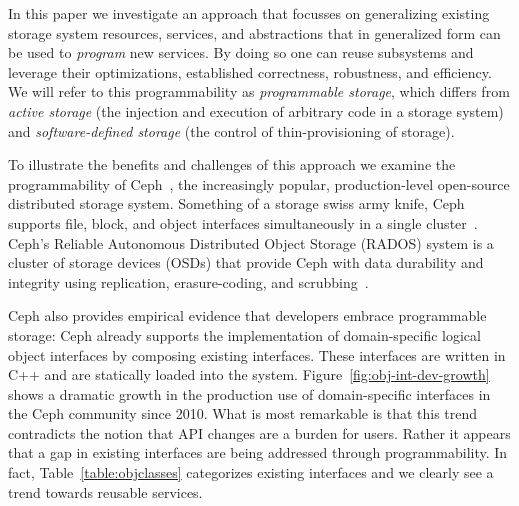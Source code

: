 \documentclass[10pt,twocolumn]{article}
\begin{document}
In this paper we investigate an approach that focusses on generalizing
existing storage system resources, services, and abstractions that in
generalized form can be used to \emph{program} new services. By doing so
one can reuse subsystems and leverage their optimizations,
established correctness, robustness, and efficiency. We will refer to
this programmability as \emph{programmable storage}, which differs from
\emph{active storage} (the injection and execution of arbitrary code in
a storage system) and \emph{software-defined storage} (the control of
thin-provisioning of storage).

To illustrate the benefits and challenges of this approach we examine
the programmability of Ceph~\cite{weil:osdi2006-ceph,ceph}, the increasingly
popular, production-level open-source distributed storage system.
Something of a storage swiss army knife, Ceph supports file, block, and
object interfaces simultaneously in a single cluster~\cite{ceph_contributors_ceph_2010}. Ceph's Reliable Autonomous 
Distributed Object Storage (RADOS) system is a cluster of storage
devices (OSDs) that provide Ceph with data durability and integrity
using replication, erasure-coding, and scrubbing~\cite{weil_rados_2007}. 

Ceph also provides empirical evidence that developers embrace programmable storage: Ceph already supports the
implementation of domain-specific logical object interfaces by composing
existing interfaces. These interfaces are written in C++ and are statically
loaded into the system. Figure~\ref{fig:obj-int-dev-growth} shows a dramatic growth in the production use of
domain-specific interfaces in the Ceph community since 2010.  What is most
remarkable is that this trend contradicts the notion that API changes are a
burden for users.
Rather it appears that a gap in existing interfaces are
being addressed through programmability. In fact, Table~\ref{table:objclasses}
categorizes existing interfaces and we clearly see a trend towards reusable
services.
\end{document}
